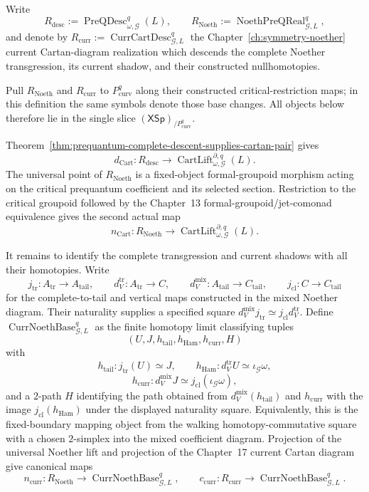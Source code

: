 \begin{definition}
\label{def:prequantum-reduced-noether-compatibility-realization}
Write
\[
R_{\mathrm{desc}}:=\operatorname{PreQDesc}_{\omega,\mathcal G}^{q}(L),
\qquad
R_{\mathrm{Noeth}}:=\operatorname{NoethPreQReal}_{\mathcal G,L}^{q},
\]
and denote by
$R_{\mathrm{curr}}:=\operatorname{CurrCartDesc}_{\mathcal G,L}^{q}$ the
Chapter~\ref{ch:symmetry-noether} current Cartan-diagram realization which
descends the complete Noether transgression, its current shadow, and their
constructed nullhomotopies.

Pull $R_{\mathrm{Noeth}}$ and $R_{\mathrm{curr}}$ to
$P_{\mathrm{curv}}^q$ along their constructed critical-restriction maps; in
this definition the same symbols denote those base changes.  All objects below
therefore lie in the single slice $(\mathsf{XSp})_{/P_{\mathrm{curv}}^q}$.

Theorem~\ref{thm:prequantum-complete-descent-supplies-cartan-pair} gives
\[
d_{\mathrm{Cart}}:R_{\mathrm{desc}}
\longrightarrow
\operatorname{CartLift}^{\partial,q}_{\omega,\mathcal G}(L).
\]
The universal point of $R_{\mathrm{Noeth}}$ is a fixed-object formal-groupoid
morphism acting on the critical prequantum coefficient and its selected
section.  Restriction to the critical groupoid followed by the Chapter~13
formal-groupoid/jet-comonad equivalence gives the second actual map
\[
n_{\mathrm{Cart}}:R_{\mathrm{Noeth}}
\longrightarrow
\operatorname{CartLift}^{\partial,q}_{\omega,\mathcal G}(L).
\]

It remains to identify the complete transgression and current shadows with all
their homotopies.  Write
\[
j_{\mathrm{tr}}:A_{\mathrm{tr}}\to A_{\mathrm{tail}},
\qquad
d_V^{\mathrm{tr}}:A_{\mathrm{tr}}\to C,
\qquad
d_V^{\mathrm{mix}}:A_{\mathrm{tail}}\to C_{\mathrm{tail}},
\qquad
j_{\mathrm{cl}}:C\to C_{\mathrm{tail}}
\]
for the complete-to-tail and vertical maps constructed in the mixed
Noether diagram.  Their naturality supplies a specified square
$d_V^{\mathrm{mix}}j_{\mathrm{tr}}\simeq
j_{\mathrm{cl}}d_V^{\mathrm{tr}}$.  Define
$\operatorname{CurrNoethBase}_{\mathcal G,L}^q$ as the finite homotopy limit
classifying tuples
\[
(U,J,h_{\mathrm{tail}},h_{\mathrm{Ham}},h_{\mathrm{curr}},H)
\]
with
\[
h_{\mathrm{tail}}:j_{\mathrm{tr}}(U)\simeq J,
\qquad
h_{\mathrm{Ham}}:d_V^{\mathrm{tr}}U\simeq\iota_{\mathcal G}\omega,
\]
\[
h_{\mathrm{curr}}:
d_V^{\mathrm{mix}}J\simeq
j_{\mathrm{cl}}(\iota_{\mathcal G}\omega),
\]
and a $2$-path $H$ identifying the path obtained from
$d_V^{\mathrm{mix}}(h_{\mathrm{tail}})$ and $h_{\mathrm{curr}}$ with the image
$j_{\mathrm{cl}}(h_{\mathrm{Ham}})$ under the displayed naturality square.
Equivalently, this is the fixed-boundary mapping object from the walking
homotopy-commutative square with a chosen $2$-simplex into the mixed coefficient
diagram.  Projection of the universal Noether lift and projection of the
Chapter~17 current Cartan diagram give canonical maps
\[
n_{\mathrm{curr}}:R_{\mathrm{Noeth}}
\longrightarrow\operatorname{CurrNoethBase}_{\mathcal G,L}^q,
\qquad
c_{\mathrm{curr}}:R_{\mathrm{curr}}
\longrightarrow\operatorname{CurrNoethBase}_{\mathcal G,L}^q.
\]


\end{definition}
